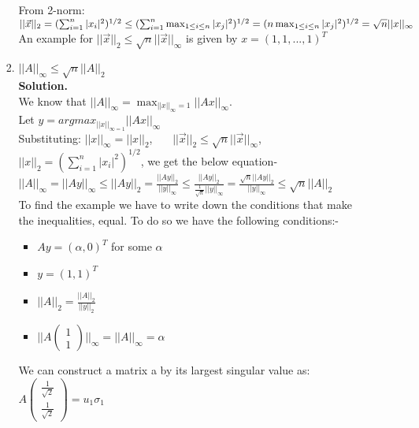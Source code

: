 \documentclass[12pt, oneside]{article}   	%
\begin{document}
\begin{enumerate}
\begin{enumerate}
\begin{enumerate}
		From 2-norm:\\
		$||\vec{x}||_2
		=  (\sum_{i=1}^{n} |x_i|^2)^{1/2}\\
		\leq (\sum_{i=1}^{n} \max_{1\leq i \leq n} |x_j|^2)^{1/2}\\
		= (n \max_{1\leq i \leq n} |x_j|^2)^{1/2}\\ 
		=\sqrt{n}||x||_\infty $\\
		
		An example for $||\vec{x}||_2 \leq \sqrt{n} ||\vec{x}||_\infty$ is given by $x=(1,1,...,1)^T$\\
		
		\item $||A||_\infty \leq \sqrt{n} ||A||_2$\\
		
		\textbf{Solution.}\\
		
		We know that $||A||_\infty =\max_{||x||_{\infty}=1} ||Ax||_\infty$.\\
		Let $y=argmax_{||x||_{\infty=1}}||Ax||_\infty$\\
		
		Substituting: $||x||_\infty= ||x||_2$,  \ \ \
		 $||\vec{x}||_2 \leq \sqrt{n} ||\vec{x}||_\infty$, \ \ \ \ $||x||_2= (\sum_{i=1}^{n} |x_i|^2)^{1/2}$, we get the below equation-\\
		
		$||A||_\infty =||Ay||_\infty \leq ||Ay||_2= \frac{||Ay||_2}{||y||_\infty} \leq \frac{||Ay||_2}{\frac{1}{\sqrt{n}}||y||_\infty}=\frac{\sqrt{n}||Ay||_2}{||y||_\infty} \leq \sqrt{n}||A||_2$\\
		
		To find the example we have to write down the conditions that make the inequalities, equal. To do so we have the following conditions:-\\
		\begin{itemize}
			\item $Ay=(\alpha,0)^T$ for some $\alpha$
			\item $y=(1,1)^T$
			\item $||A||_2=\frac{||A||_2}{||y||_2}$
			\item $||A(\begin{array}{c}1\\1
			\end{array})||_\infty= ||A||_\infty=\alpha$
		\end{itemize}
		We can construct a matrix a by its largest singular value as:\\
		$A(\begin{array}{c}\frac{1}{\sqrt{2}}\\\frac{1}{\sqrt{2}}
		\end{array})= u_1 \sigma_1$\\
		

\end{enumerate}
\end{enumerate}
\end{enumerate}
\end{document}
